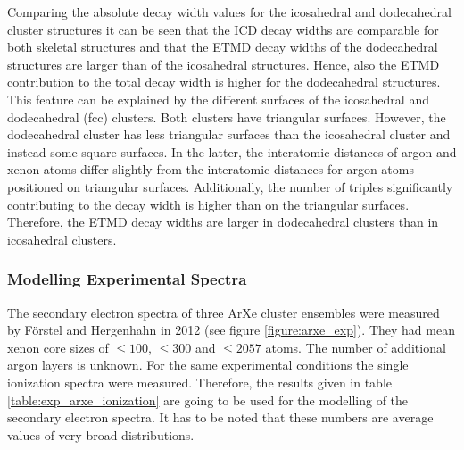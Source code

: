 Comparing the absolute decay width values for the icosahedral and dodecahedral
cluster structures it can be seen that the ICD decay widths are comparable
for both skeletal structures and that the ETMD decay widths of the dodecahedral
structures are larger than of the icosahedral structures. Hence, also the
ETMD contribution to the total decay width is higher for the dodecahedral
structures.
This feature can be explained by the different surfaces of the icosahedral
and dodecahedral (fcc) clusters. Both clusters have triangular surfaces.
However, the dodecahedral cluster has less triangular surfaces than the
icosahedral cluster and instead some square surfaces. In the latter, the
interatomic distances of argon and xenon atoms differ slightly
from the interatomic distances for argon atoms positioned on triangular surfaces.
Additionally, the number of triples significantly contributing to the
decay width is higher than on the triangular surfaces.
Therefore, the ETMD decay widths are larger
in dodecahedral clusters than in icosahedral clusters.



\subsubsection{Modelling Experimental Spectra}

The secondary electron spectra of three ArXe cluster ensembles were measured by
Förstel and Hergenhahn in 2012 (see figure \ref{figure:arxe_exp}).
They had mean xenon core sizes
of $\le100$, $\le300$ and $\le2057$ atoms. The number of additional argon
layers is unknown.
For the same experimental conditions the single ionization spectra were
measured. Therefore, the results given in table \ref{table:exp_arxe_ionization}
are going to be used for the modelling of the secondary electron spectra.
It has to be noted that these numbers are average values of very broad
distributions.

